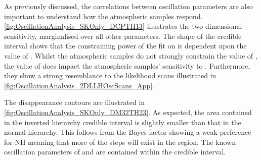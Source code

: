 As previously discussed, the correlations between oscillation parameters are also important to understand how the atmospheric samples respond. \autoref{fig:OscillationAnalysis_SKOnly_DCPTH13} illustrates the two dimensional  sensitivity, marginalised over all other parameters.
The shape of the \quickmath{1\sigma} credible interval shows that the constraining power of the fit on  is dependent upon the value of .
Whilst the atmospheric samples do not strongly constrain the value of , the value of  does impact the atmospheric samples' sensitivity to .
Furthermore, they show a strong resemblance to the likelihood scans illustrated in \autoref{fig:OscillationAnalysis_2DLLHOscScans_App}.

The  disappearance contours are illustrated in \autoref{fig:OscillationAnalysis_SKOnly_DM32TH23}. As expected, the area contained in the inverted hierarchy \quickmath{1\sigma} credible interval is slightly smaller than that in the normal hierarchy. This follows from the Bayes factor showing a weak preference for NH meaning that more of the steps will exist in the  region. The known oscillation parameters of  and  are contained within the \quickmath{1\sigma} credible interval.

